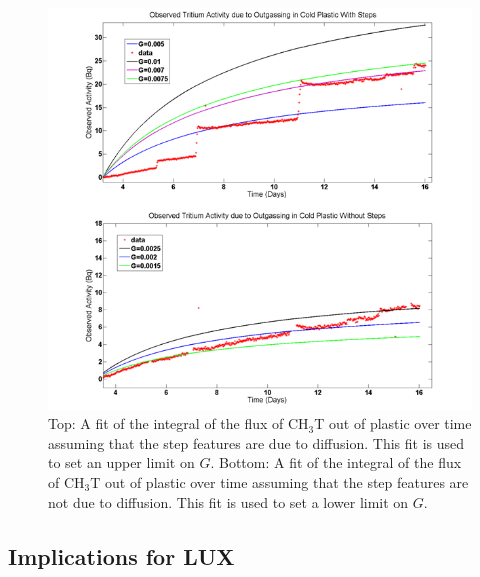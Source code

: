 \begin{figure}[H]
\centering
\includegraphics[scale=0.4]{StepsandNoSteps.png}
\caption{Top: A fit of the integral of the flux of CH$_3$T out of plastic over time assuming that the step features are due to diffusion.  This fit is used to set an upper limit on $G$.  Bottom: A fit of the integral of the flux of CH$_3$T out of plastic over time assuming that the step features are not due to diffusion.  This fit is used to set a lower limit on $G$. }
\label{fig:StepsFit}
\end{figure}

\subsection{Implications for LUX}

